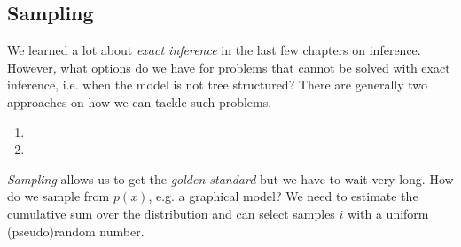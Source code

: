 \subsection{Sampling}
We learned a lot about \emph{exact inference} in the last few chapters on inference. %
However, what options do we have for problems that cannot be solved with exact inference, i.e. when the model is not tree structured? %
There are generally two approaches on how we can tackle such problems. %
\begin{enumerate}
	\item{}
	\item{}
\end{enumerate}
\emph{Sampling} allows us to get the \textit{golden standard} but we have to wait very long. %
How do we sample from \ensuremath{p(x)}, e.g. a graphical model?
We need to estimate the cumulative sum over the distribution and can select samples \ensuremath{i} with a uniform (pseudo)random number. %
\\%

